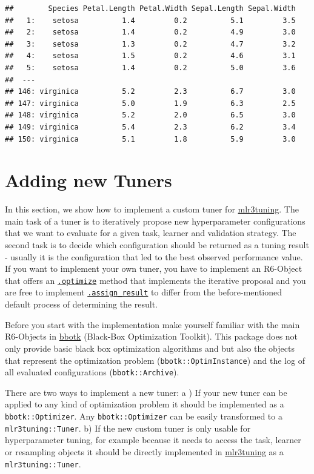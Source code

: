 \documentclass[
]{scrbook}
\begin{document}
\begin{verbatim}
##        Species Petal.Length Petal.Width Sepal.Length Sepal.Width
##   1:    setosa          1.4         0.2          5.1         3.5
##   2:    setosa          1.4         0.2          4.9         3.0
##   3:    setosa          1.3         0.2          4.7         3.2
##   4:    setosa          1.5         0.2          4.6         3.1
##   5:    setosa          1.4         0.2          5.0         3.6
##  ---                                                            
## 146: virginica          5.2         2.3          6.7         3.0
## 147: virginica          5.0         1.9          6.3         2.5
## 148: virginica          5.2         2.0          6.5         3.0
## 149: virginica          5.4         2.3          6.2         3.4
## 150: virginica          5.1         1.8          5.9         3.0
\end{verbatim}

\hypertarget{extending-tuners}{%
\section{Adding new Tuners}\label{extending-tuners}}

In this section, we show how to implement a custom tuner for \href{https://mlr3tuning.mlr-org.com}{mlr3tuning}.
The main task of a tuner is to iteratively propose new hyperparameter configurations that we want to evaluate for a given task, learner and validation strategy.
The second task is to decide which configuration should be returned as a tuning result - usually it is the configuration that led to the best observed performance value.
If you want to implement your own tuner, you have to implement an R6-Object that offers an \protect\hyperlink{tuner-optimize}{\texttt{.optimize}} method that implements the iterative proposal and you are free to implement \protect\hyperlink{tuner-add-result}{\texttt{.assign\_result}} to differ from the before-mentioned default process of determining the result.

Before you start with the implementation make yourself familiar with the main R6-Objects in \href{https://bbotk.mlr-org.com}{bbotk} (Black-Box Optimization Toolkit).
This package does not only provide basic black box optimization algorithms and but also the objects that represent the optimization problem (\texttt{bbotk::OptimInstance}) and the log of all evaluated configurations (\texttt{bbotk::Archive}).

There are two ways to implement a new tuner:
a ) If your new tuner can be applied to any kind of optimization problem it should be implemented as a \texttt{bbotk::Optimizer}.
Any \texttt{bbotk::Optimizer} can be easily transformed to a \texttt{mlr3tuning::Tuner}.
b) If the new custom tuner is only usable for hyperparameter tuning, for example because it needs to access the task, learner or resampling objects it should be directly implemented in \href{https://mlr3tuning.mlr-org.com}{mlr3tuning} as a \texttt{mlr3tuning::Tuner}.
\end{document}
